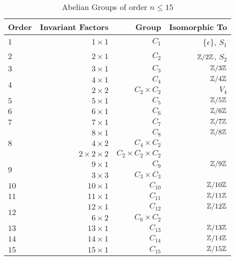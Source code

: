 \begin{center}
  \begin{table}
    \begin{tabular}{ l | r | r | r }
      Order & Invariant Factors & Group & Isomorphic To \\
      \midrule
      $1$ & $1 \times 1$ & $C_1$ & $\{ \epsilon \}$, $S_1$ \\
      \midrule
      $2$ & $2 \times 1$ & $C_2$ & $\mathbb{Z}/2\mathbb{Z}$, $S_2$ \\
      \midrule
      $3$ & $3 \times 1$ & $C_3$ & $\mathbb{Z}/3\mathbb{Z}$ \\
      \midrule
      \multirow{2}{*}{$4$} & $4 \times 1$ & $C_4$ & $\mathbb{Z}/4\mathbb{Z}$ \\
          & $2 \times 2$ & $C_2 \times C_2$ & $V_4$ \\
      \midrule
      $5$ & $5 \times 1$ & $C_5$ & $\mathbb{Z}/5\mathbb{Z}$ \\
      \midrule
      $6$ & $6 \times 1$ & $C_6$ & $\mathbb{Z}/6\mathbb{Z}$ \\
      \midrule
      $7$ & $7 \times 1$ & $C_7$ & $\mathbb{Z}/7\mathbb{Z}$ \\
      \midrule
      \multirow{3}{*}{$8$} & $8 \times 1$ & $C_8$ & $\mathbb{Z}/8\mathbb{Z}$ \\
          & $4 \times 2$ & $C_4 \times C_2$ & \\
          & $2 \times 2 \times 2$ & $C_2 \times C_2 \times C_2$ &  \\
      \midrule
      \multirow{2}{*}{$9$} & $9 \times 1$ & $C_9$ & $\mathbb{Z}/9\mathbb{Z}$ \\
          & $3 \times 3$ & $C_3 \times C_3$ & \\
      \midrule
      $10$ & $10 \times 1$ & $C_{10}$ & $\mathbb{Z}/10\mathbb{Z}$ \\
      \midrule
      $11$ & $11 \times 1$ & $C_{11}$ & $\mathbb{Z}/11\mathbb{Z}$ \\
      \midrule
      \multirow{2}{*}{$12$} & $12 \times 1$ & $C_{12}$ & $\mathbb{Z}/12\mathbb{Z}$ \\
          & $6 \times 2$ & $C_6 \times C_2$ & \\
      \midrule
      $13$ & $13 \times 1$ & $C_{13}$ & $\mathbb{Z}/13\mathbb{Z}$ \\
      \midrule
      $14$ & $14 \times 1$ & $C_{14}$ & $\mathbb{Z}/14\mathbb{Z}$ \\
      \midrule
      $15$ & $15 \times 1$ & $C_{15}$ & $\mathbb{Z}/15\mathbb{Z}$ \\
      \bottomrule
    \end{tabular}~\label{tab:abelian-groups}
    \caption{Abelian Groups of order $n \le 15$}
  \end{table}
\end{center}

